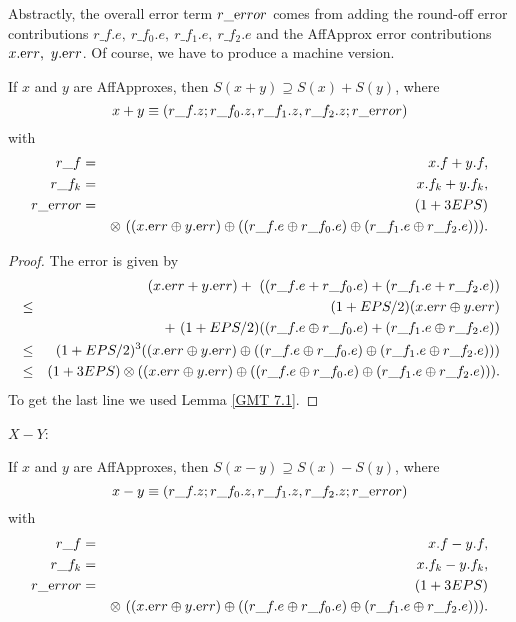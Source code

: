 Abstractly, the overall error term $r\_{\textrm error}$ comes from adding the round-off error contributions $r\_f.e,\  r\_f_0.e,\  r\_f_1.e, 
\ r\_f_2.e$ and the AffApprox error contributions $x.{\textrm err},\  y.{\textrm err}$.  Of course, we have to produce a machine version.

\begin{proposition}\label{GMT prop8.2} If $x$ and $y$ are 
{\textrm AffApproxes, }
then $S(x + y) \supseteq S(x) + S(y)${\textrm ,} where
$$x + y \equiv (r\_f.z; r\_f_0.z, r\_f_1.z, r\_f_2.z; r\_{\textrm error})$$
with
\begin{eqnarray*}
r\_f &=& x.f + y.f,\\
r\_f_k &=& x.f_k + y.f_k,\\
r\_{\textrm error}& =& (1 + 3EPS)\\
&&\otimes\ ((x.{\textrm err} \oplus y.{\textrm err}) \oplus ((r\_f.e \oplus
r\_f_0.e) \oplus (r\_f_1.e \oplus r\_f_2.e))).
\end{eqnarray*}
\end{proposition}

\begin{proof}{}
The error is given by 
\begin{eqnarray*}
&&\hskip-24pt (x.{\textrm err} + y.{\textrm err})  +\ ((r\_f.e + r\_f_0.e) + (r\_f_1.e + r\_f_2.e))\\
&\le& (1+EPS/2) (x.{\textrm err} \oplus
y.{\textrm err}) \\
&&+\ (1+EPS/2)((r\_f.e \oplus r\_f_0.e) + (r\_f_1.e \oplus r\_f_2.e))\\
&\le& (1+EPS/2)^3 ((x.{\textrm err} \oplus
y.{\textrm err}) \oplus ((r\_f.e \oplus r\_f_0.e) \oplus (r\_f_1.e \oplus r\_f_2.e)))\\
&\le& (1 + 3EPS) \otimes ((x.{\mathrm
err} \oplus y.{\textrm err}) \oplus ((r\_f.e \oplus r\_f_0.e) \oplus (r\_f_1.e \oplus r\_f_2.e))).
\end{eqnarray*}
 To get the last line
we used Lemma \ref{GMT 7.1}. \end{proof}

$X - Y$:

\begin{proposition}\label{GMT prop8.3} If $x$ and $y$ are {\textrm AffApproxes,} then $S(x - y) \supseteq S(x) - S(y)${\textrm ,}
 where
$$x - y \equiv (r\_f.z; r\_f_0.z, r\_f_1.z, r\_f_2.z; r\_{\textrm error})$$
with
\begin{eqnarray*}
r\_f& =& x.f - y.f,\\
r\_f_k &= &x.f_k - y.f_k,\\
r\_{\textrm error} &=& (1 + 3EPS)\\
&& \otimes\ ((x.{\textrm err} \oplus y.{\textrm err}) \oplus ((r\_f.e
\oplus r\_f_0.e) \oplus (r\_f_1.e \oplus r\_f_2.e))).
\end{eqnarray*}
\end{proposition}

